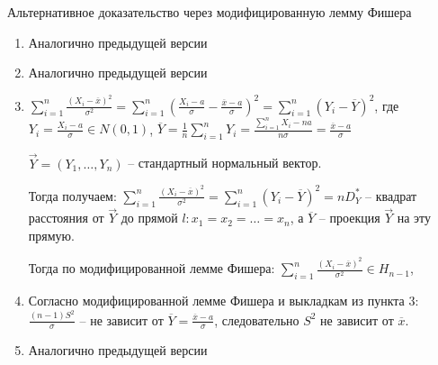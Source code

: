 \begin{MyProof}
    Альтернативное доказательство через модифицированную лемму Фишера \hfill \TagYTwoEight
    \begin{enumerate}
        \item Аналогично предыдущей версии

        \item Аналогично предыдущей версии
        
        \item $\sum_{i = 1}^n \frac{(X_i - \overline{x})^2}{\sigma^2} = \sum_{i = 1}^n \left(\frac{X_i - a}{\sigma} - \frac{\overline{x} - a}{\sigma}\right)^2 = 
        \sum_{i = 1}^n (Y_i - \overline{Y})^2$, где $Y_i = \frac{X_i - a}{\sigma} \in N(0, 1)$, $\overline{Y} = \frac{1}{n} \sum_{i = 1}^n Y_i = \frac{\sum_{i = 1}^n X_i - na}{n \sigma} = \frac{\overline{x} - a}{\sigma}$

        $\vec Y = (Y_1, \dots , Y_n)$ -- стандартный нормальный вектор.

        Тогда получаем: $\sum_{i = 1}^n \frac{(X_i - \overline{x})^2}{\sigma^2} = \sum_{i=1}^n (Y_i - \overline{Y})^2 = nD_Y^*$ -- квадрат расстояния от
        $\vec Y$ до прямой $l: x_1 = x_2 = \dots = x_n$, а $\overline{Y}$ -- проекция $\vec Y$ на эту прямую.

        Тогда по модифицированной лемме Фишера: $\sum_{i = 1}^n \frac{(X_i - \overline{x})^2}{\sigma^2} \in H_{n-1}$,
        
        \setcounter{enumi}{4}
        \item Согласно модифицированной лемме Фишера и выкладкам из пункта 3: 
        $\frac{(n-1)S^2}{\sigma}$ -- не зависит от $\overline{Y} = \frac{\overline{x} - a}{\sigma}$, следовательно $S^2$ не зависит от $\overline{x}$.
          
        \setcounter{enumi}{3}
        \item Аналогично предыдущей версии
    \end{enumerate}
\end{MyProof}






